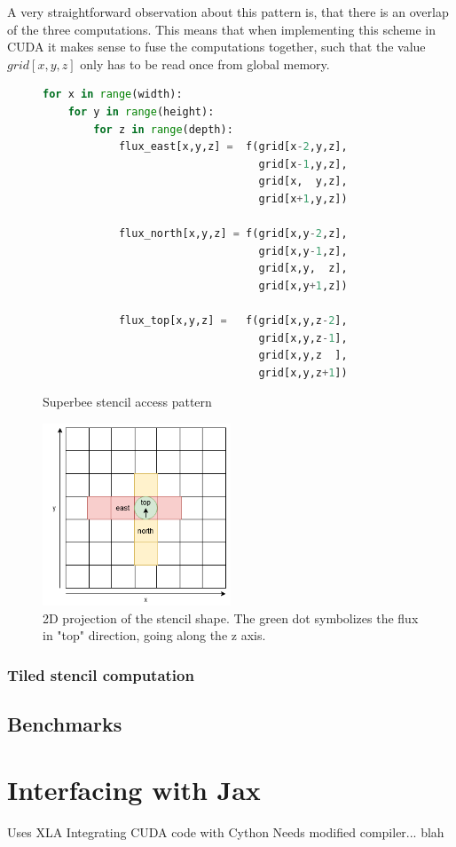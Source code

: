 \documentclass[a4paper,oneside]{memoir}
\begin{document}
A very straightforward observation about this pattern is, that there is an overlap of the three computations. This means that when implementing this scheme in CUDA it makes sense to fuse the computations together, such that the value $grid\left[x,y,z\right]$ only has to be read once from global memory.
\begin{figure}[hbtp]
    \caption{Superbee stencil access pattern}
    \label{fig:stencil_code}
    \begin{lstlisting}[language=python,frame=single]
for x in range(width):
    for y in range(height):
        for z in range(depth):
            flux_east[x,y,z] =  f(grid[x-2,y,z], 
                                  grid[x-1,y,z],
                                  grid[x,  y,z],
                                  grid[x+1,y,z])

            flux_north[x,y,z] = f(grid[x,y-2,z], 
                                  grid[x,y-1,z],
                                  grid[x,y,  z],
                                  grid[x,y+1,z])

            flux_top[x,y,z] =   f(grid[x,y,z-2], 
                                  grid[x,y,z-1],
                                  grid[x,y,z  ],
                                  grid[x,y,z+1])
    \end{lstlisting}
\end{figure}
\begin{figure}[h]
    \centering
    \includegraphics[width=0.5\textwidth]{stencil.png}
    \caption{2D projection of the stencil shape. The green dot symbolizes the flux in "top" direction, going along the z axis.}
    \label{fig:stencil_shape}
\end{figure}
\subsubsection{Tiled stencil computation}

\subsection{Benchmarks}
\section{Interfacing with Jax}
\label{sec:integrate}
Uses XLA
Integrating CUDA code with Cython
Needs modified compiler... blah





\end{document}
